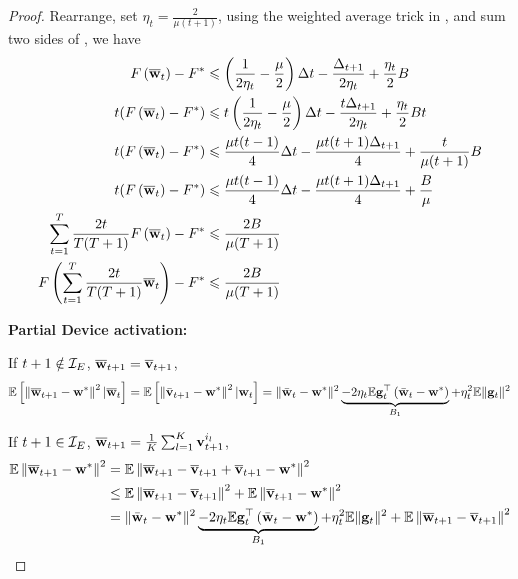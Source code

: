 \begin{proof}
Rearrange, set $\eta_t = \frac{2}{\mu(t+1)} $, using the weighted average trick in \cite{lacoste2012simpler}, and sum two sides of \eq{\ref{eq:scvxnsmth5}}, we have
\begin{align}
F\left({\overline{\mathbf{w}}}_{t}\right)-F^{*} &\leqslant \left(\frac{1}{2 \eta_{t}}-\frac{\mu}{2}\right) \Delta t-\frac{\Delta_{t+1}}{2 \eta_{t}}+\frac{\eta_{t}}{2} B\\
t(F\left({\overline{\mathbf{w}}}_{t}\right)-F^{*}) & \leqslant t\left(\frac{1}{2 \eta_{t}}-\frac{\mu}{2}\right) \Delta t-\frac{t\Delta_{t+1}}{2 \eta_{t}}+\frac{\eta_{t}}{2} Bt\\
t(F\left({\overline{\mathbf{w}}}_{t}\right)-F^{*}) & \leqslant \frac{\mu t(t-1)}{4} \Delta t- \frac{\mu t(t+1)\Delta_{t+1}}{4}+\frac{t}{\mu(t+1)} B\\
t(F\left({\overline{\mathbf{w}}}_{t}\right)-F^{*}) & \leqslant \frac{\mu t(t-1)}{4} \Delta t- \frac{\mu t(t+1)\Delta_{t+1}}{4}+\frac{B}{\mu}\\
\sum_{t=1}^T \frac{2t}{T(T+1)}F\left({\overline{\mathbf{w}}}_{t}\right)-F^{*} & \leqslant \frac{2B}{\mu(T+1)} \\
F\left(\sum_{t=1}^T \frac{2t}{T(T+1)} {\overline{\mathbf{w}}}_{t}\right)-F^{*} & \leqslant \frac{2B}{\mu(T+1)} 
\end{align}

\textbf{Partial Device activation: }

If $t + 1 \notin {\mathcal{I}}_{E}$, ${\overline{\mathbf{w}}}_{t+1} = {\overline{\mathbf{v}}}_{t+1}$, 
\begin{align}
\mathbb{E}\left[\left\|{\overline{\mathbf{w}}}_{t+1}-{\mathbf{w}}^{*}\right\|^2| {\overline{\mathbf{w}}}_{t}\right] = \mathbb{E}\left[\left\|\bar{{\mathbf{v}}}_{t+1}-{\mathbf{w}}^{*}\right\|^2| {\mathbf{w}}_{t}\right]=\|\bar{{\mathbf{w}}}_{t}-{\mathbf{w}}^{*}\|^{2} \underbrace{ - 2 \eta_{t} \mathbb{E} {\mathbf{g}}_{t}^{\top}\left(\bar{{\mathbf{w}}}_{t}-{\mathbf{w}}^{*}\right)}_{B_1} + \eta_{t}^{2} \mathbb{E}\| {\mathbf{g}}_{t} \|^{2}	
\label{eq:expandp1}
\end{align}

If $t + 1 \in {\mathcal{I}}_{E}$, ${\overline{\mathbf{w}}}_{t+1} = \frac{1}{K}\sum_{l=1}^K {\mathbf{v}}_{t+1}^{i_l}$, 
\begin{align}
\mathbb{E}\left\|{\overline{\mathbf{w}}}_{t+1}-{\mathbf{w}}^{*}\right\|^2 & =  \mathbb{E}\left\|{\overline{\mathbf{w}}}_{t+1} - {\overline{\mathbf{v}}}_{t+1} + {\overline{\mathbf{v}}}_{t+1} -{\mathbf{w}}^{*}\right\|^2 \\
& \leq \mathbb{E}\left\|{\overline{\mathbf{w}}}_{t+1} - {\overline{\mathbf{v}}}_{t+1}\right\|^2 + \mathbb{E} \left\| {\overline{\mathbf{v}}}_{t+1} -{\mathbf{w}}^{*}\right\|^2 \\
&= \|\bar{{\mathbf{w}}}_{t}-{\mathbf{w}}^{*}\|^{2} \underbrace{ - 2 \eta_{t} \mathbb{E} {\mathbf{g}}_{t}^{\top}\left(\bar{{\mathbf{w}}}_{t}-{\mathbf{w}}^{*}\right)}_{B_1} + \eta_{t}^{2} \mathbb{E}\| {\mathbf{g}}_{t} \|^{2}	+ \mathbb{E}\left\|{\overline{\mathbf{w}}}_{t+1} - {\overline{\mathbf{v}}}_{t+1}\right\|^2
\label{eq:expandp2}
\end{align}


\end{proof}
